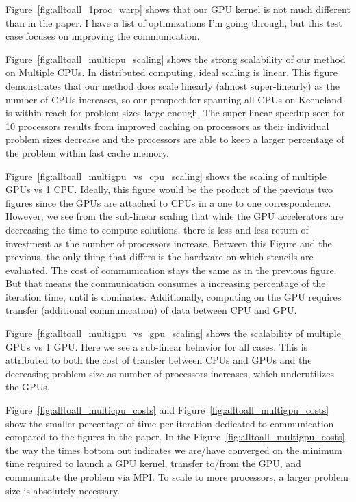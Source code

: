 Figure~\ref{fig:alltoall_1proc_warp} shows that our GPU kernel is not much different than in the paper. I have a list of optimizations I'm going through, but this test case focuses on improving the communication. 

Figure~\ref{fig:alltoall_multicpu_scaling}  shows the strong scalability of our method on Multiple CPUs. In distributed computing, ideal scaling is linear. This figure demonstrates that our method does scale linearly (almost super-linearly) as the number of CPUs increases, so our prospect for spanning all CPUs on Keeneland is within reach for problem sizes large enough. The super-linear speedup seen for 10 processors results from improved caching on processors as their individual problem sizes decrease and the processors are able to keep a larger percentage of the problem within fast cache memory.

Figure~\ref{fig:alltoall_multigpu_vs_cpu_scaling}  shows the scaling of multiple GPUs vs 1 CPU. Ideally, this figure would be the product of the previous two figures since the GPUs are attached to CPUs in a one to one correspondence. However, we see from the sub-linear scaling that while the GPU accelerators are decreasing the time to compute solutions, there is less and less return of investment as the number of processors increase. Between this Figure and the previous, the only thing that differs is the hardware on which stencils are evaluated. The cost of communication stays the same as in the previous figure. But that means the communication consumes a increasing percentage of the iteration time, until is dominates. 
Additionally, computing on the GPU requires transfer (additional communication) of data between CPU and GPU. 

Figure~\ref{fig:alltoall_multigpu_vs_gpu_scaling} shows the scalability of multiple GPUs vs 1 GPU. Here we see a sub-linear behavior for all cases. This is attributed to both the cost of transfer between CPUs and GPUs and the decreasing problem size as number of processors increases, which underutilizes the GPUs. 


Figure~\ref{fig:alltoall_multicpu_costs} and Figure~\ref{fig:alltoall_multigpu_costs} show the smaller percentage of time per iteration dedicated to communication compared to the figures in the paper. In the Figure~\ref{fig:alltoall_multigpu_costs}, the way the times bottom out indicates we are/have converged on the minimum time required to launch a GPU kernel, transfer to/from the GPU, and communicate the problem via MPI. To scale to more processors, a larger problem size is absolutely necessary.


